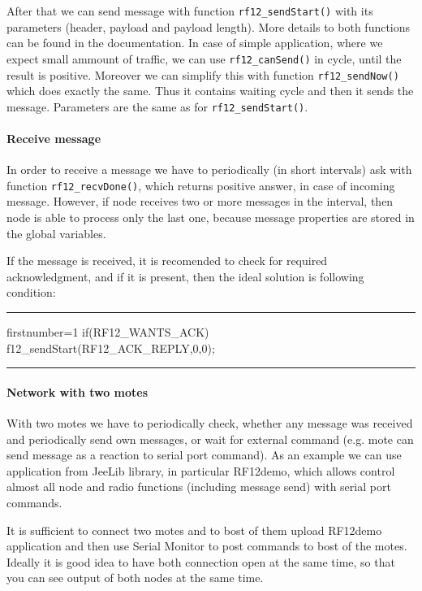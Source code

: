 \documentclass[12pt,titlepage]{article}
\newcommand{\codetitle}[1]{\bigskip \noindent {\scriptsize #1}\hrule}
\begin{document}
        After that we can send message with function \texttt{rf12\_sendStart()} with its parameters (header, payload and payload length). More details to both functions can be found in the documentation. In case of simple application, where we expect small ammount of traffic, we can use \texttt{rf12\_canSend()} in cycle, until the result is positive. Moreover we can simplify this with function \texttt{rf12\_sendNow()} which does exactly the same. Thus it contains waiting cycle and then it sends the message. Parameters are the same as for  \texttt{rf12\_sendStart()}.

        \paragraph{Receive message}
        In order to receive a message we have to periodically (in short intervals) ask with function \texttt{rf12\_recvDone()}, which returns positive answer, in case of incoming message. However, if node receives two or more messages in the interval, then node is able to process only the last one, because message properties are stored in the global variables.

        If the message is received, it is recomended to check for required acknowledgment, and if it is present, then the ideal solution is following condition:

        \codetitle{Example condition for ACK checking}
        \begin{cppcode*}{firstnumber=1}
        if(RF12_WANTS_ACK){
            f12_sendStart(RF12_ACK_REPLY,0,0);
        }
        \end{cppcode*}
        \hrule
        \bigskip

        \paragraph{Network with two motes}
        With two motes we have to periodically check, whether any message was received and periodically send own messages, or wait for external command (e.g. mote can send message as a reaction to serial port command). As an example we can use application from JeeLib library, in particular RF12demo, which allows control almost all node and radio functions (including message send) with serial port commands.

        It is sufficient to connect two motes and to bost of them upload RF12demo application and then use Serial Monitor to post commands to bost of the motes. Ideally it is good idea to have both connection open at the same time, so that you can see output of both nodes at the same time.
\end{document}
